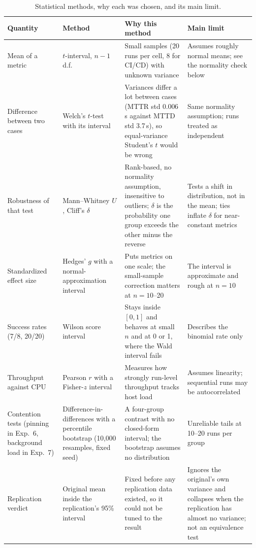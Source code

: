 \documentclass[conference]{IEEEtran}
\begin{document}
\begin{table}[t]
\centering
\caption{Statistical methods, why each was chosen, and its main limit.}
\label{tab:stats}
\small
\begin{tabular}{@{}>{\raggedright\arraybackslash}p{}>{\raggedright\arraybackslash}p{}>{\raggedright\arraybackslash}p{}>{\raggedright\arraybackslash}p{}@{}}
\toprule
Quantity & Method & Why this method & Main limit \\
\midrule
Mean of a metric & $t$-interval, $n{-}1$ d.f. & Small samples (20 runs per cell, 8 for CI/CD) with unknown variance & Assumes roughly normal means; see the normality check below \\
Difference between two cases & Welch's $t$-test with its interval & Variances differ a lot between cases (MTTR std 0.006\,s against MTTD std 3.7\,s), so equal-variance Student's $t$ would be wrong & Same normality assumption; runs treated as independent \\
Robustness of that test & Mann--Whitney $U$, Cliff's $\delta$ & Rank-based, no normality assumption, insensitive to outliers; $\delta$ is the probability one group exceeds the other minus the reverse & Tests a shift in distribution, not in the mean; ties inflate $\delta$ for near-constant metrics \\
Standardized effect size & Hedges' $g$ with a normal-approximation interval & Puts metrics on one scale; the small-sample correction matters at $n{=}10$--20 & The interval is approximate and rough at $n{=}10$ \\
Success rates (7/8, 20/20) & Wilson score interval & Stays inside $[0,1]$ and behaves at small $n$ and at 0 or 1, where the Wald interval fails & Describes the binomial rate only \\
Throughput against CPU & Pearson $r$ with a Fisher-$z$ interval & Measures how strongly run-level throughput tracks host load & Assumes linearity; sequential runs may be autocorrelated \\
Contention tests (pinning in Exp.~6, background load in Exp.~7) & Difference-in-differences with a percentile bootstrap (10{,}000 resamples, fixed seed) & A four-group contrast with no closed-form interval; the bootstrap assumes no distribution & Unreliable tails at 10--20 runs per group \\
Replication verdict & Original mean inside the replication's 95\% interval & Fixed before any replication data existed, so it could not be tuned to the result & Ignores the original's own variance and collapses when the replication has almost no variance; not an equivalence test \\
\bottomrule
\end{tabular}
\end{table}
\end{document}

